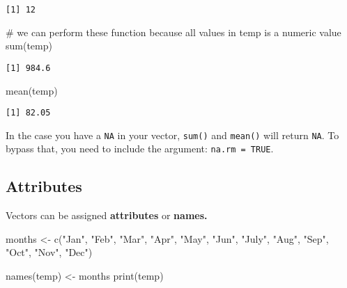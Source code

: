 \documentclass[
  letterpaper,
  DIV=11,
  numbers=noendperiod]{scrreprt}
\newenvironment{Shaded}{\begin{snugshade}}{\end{snugshade}}
\newcommand{\CommentTok}[1]{\textcolor[rgb]{0.37,0.37,0.37}{#1}}
\newcommand{\FunctionTok}[1]{\textcolor[rgb]{0.28,0.35,0.67}{#1}}
\newcommand{\NormalTok}[1]{\textcolor[rgb]{0.00,0.23,0.31}{#1}}
\newcommand{\OtherTok}[1]{\textcolor[rgb]{0.00,0.23,0.31}{#1}}
\newcommand{\StringTok}[1]{\textcolor[rgb]{0.13,0.47,0.30}{#1}}
\begin{document}
\begin{verbatim}
[1] 12
\end{verbatim}

\begin{Shaded}
\begin{Highlighting}[]
\CommentTok{\# we can perform these function because all values in temp is a numeric value}
\FunctionTok{sum}\NormalTok{(temp)}
\end{Highlighting}
\end{Shaded}

\begin{verbatim}
[1] 984.6
\end{verbatim}

\begin{Shaded}
\begin{Highlighting}[]
\FunctionTok{mean}\NormalTok{(temp)}
\end{Highlighting}
\end{Shaded}

\begin{verbatim}
[1] 82.05
\end{verbatim}

In the case you have a \texttt{NA} in your vector, \texttt{sum()} and
\texttt{mean()} will return \texttt{NA}. To bypass that, you need to
include the argument: \texttt{na.rm\ =\ TRUE}.

\subsection*{Attributes}\label{attributes}

Vectors can be assigned \textbf{attributes} or \textbf{names.}

\begin{Shaded}
\begin{Highlighting}[]
\NormalTok{months }\OtherTok{\textless{}{-}} \FunctionTok{c}\NormalTok{(}\StringTok{"Jan"}\NormalTok{, }\StringTok{"Feb"}\NormalTok{, }\StringTok{"Mar"}\NormalTok{, }\StringTok{"Apr"}\NormalTok{, }\StringTok{"May"}\NormalTok{, }\StringTok{"Jun"}\NormalTok{, }\StringTok{"July"}\NormalTok{,}
    \StringTok{"Aug"}\NormalTok{, }\StringTok{"Sep"}\NormalTok{, }\StringTok{"Oct"}\NormalTok{, }\StringTok{"Nov"}\NormalTok{, }\StringTok{"Dec"}\NormalTok{)}

\FunctionTok{names}\NormalTok{(temp) }\OtherTok{\textless{}{-}}\NormalTok{ months}
\FunctionTok{print}\NormalTok{(temp)}
\end{Highlighting}
\end{Shaded}
\end{document}
